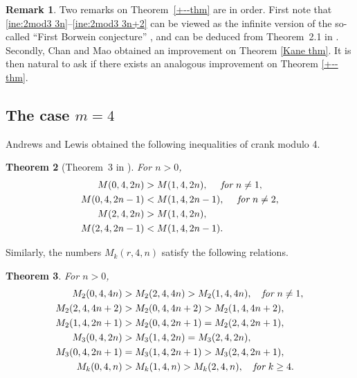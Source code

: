 \documentclass[12pt]{amsart}
\numberwithin{equation}{section}
\theoremstyle{plain}
\newtheorem{theorem}{Theorem}[section]
\theoremstyle{definition}
\newtheorem{remark}[theorem]{Remark}
\begin{document}
\begin{remark}
Two remarks on Theorem~\ref{+--thm} are in order. First note that \eqref{ine:2mod3 3n}--\eqref{ine:2mod3 3n+2} can be viewed as the infinite version of the so-called ``First Borwein conjecture'' \cite[(1.1)]{Andr4}, and can be deduced from Theorem~2.1 in \cite{Andr4}. Secondly, Chan and Mao obtained an improvement \cite[Corollary 1.8]{CM} on Theorem \ref{Kane thm}. It is then natural to ask if there exists an analogous improvement on Theorem \ref{+--thm}.
\end{remark}


\subsection{The case $m=4$}
Andrews and Lewis obtained the following inequalities of crank modulo 4.
\begin{theorem}[Theorem~3 in \cite{AL}]
For $n>0$,
\begin{align*}
M(0,4,2n) &>M(1,4,2n), \quad~\emph{for}~n\neq1,\\
M(0,4,2n-1) &<M(1,4,2n-1), \quad~\emph{for}~n\neq2,\\
M(2,4,2n) &>M(1,4,2n),\\
M(2,4,2n-1) &<M(1,4,2n-1).
\end{align*}
\end{theorem}
Similarly, the numbers $M_{k}(r,4,n)$ satisfy the following relations.
\begin{theorem}
For $n>0$,
\begin{align}
M_{2}(0,4,4n) &>M_{2}(2,4,4n)>M_{2}(1,4,4n),\quad \emph{for}~n\neq1,\label{ine:2mod4 4n}\\
M_{2}(2,4,4n+2) &>M_{2}(0,4,4n+2)>M_{2}(1,4,4n+2),\label{ine:2mod4 4n+2}\\
M_{2}(1,4,2n+1) &>M_{2}(0,4,2n+1)=M_{2}(2,4,2n+1), \label{ine:2mod4 2n+1}\\
M_{3}(0,4,2n) &>M_{3}(1,4,2n)=M_{3}(2,4,2n),\nonumber\\
M_{3}(0,4,2n+1) &=M_{3}(1,4,2n+1)>M_{3}(2,4,2n+1),\nonumber\\
M_{k}(0,4,n) &>M_{k}(1,4,n)>M_{k}(2,4,n),\quad \emph{for}~k\geq4. \nonumber
\end{align}
\end{theorem}
\end{document}
